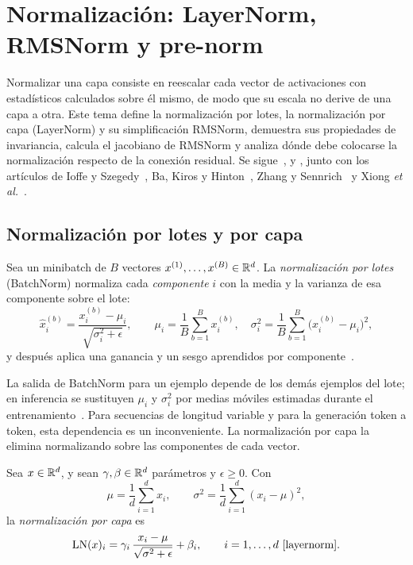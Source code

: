 \chapter{Normalización: LayerNorm, RMSNorm y pre-norm}
\label{tema:3}

Normalizar una capa consiste en reescalar cada vector de activaciones con estadísticos calculados sobre él mismo, de modo que su escala no derive de una capa a otra. Este tema define la normalización por lotes, la normalización por capa (LayerNorm) y su simplificación RMSNorm, demuestra sus propiedades de invariancia, calcula el jacobiano de RMSNorm y analiza dónde debe colocarse la normalización respecto de la conexión residual. Se sigue~\cite[§7.4]{bishopdl}, \cite[§8.5]{d2l} y \cite[§8.7.1]{gbc}, junto con los artículos de Ioffe y Szegedy~\cite{ioffe}, Ba, Kiros y Hinton~\cite{layernorm}, Zhang y Sennrich~\cite{rmsnorm} y Xiong \emph{et al.}~\cite{xiong}.

\section{Normalización por lotes y por capa}

\begin{definicion}\label{def:batchnorm}
Sea un minibatch de $B$ vectores $x^{(1)},\dots,x^{(B)}\in\mathbb{R}^{d}$. La \emph{normalización por lotes} (BatchNorm) normaliza cada \emph{componente} $i$ con la media y la varianza de esa componente sobre el lote:
\[
\hat x^{(b)}_i=\frac{x^{(b)}_i-\mu_i}{\sqrt{\sigma_i^{2}+\epsilon}},\qquad
\mu_i=\frac1B\sum_{b=1}^{B}x^{(b)}_i,\quad \sigma_i^{2}=\frac1B\sum_{b=1}^{B}\bigl(x^{(b)}_i-\mu_i\bigr)^{2},
\]
y después aplica una ganancia y un sesgo aprendidos por componente~\cite{ioffe}.
\end{definicion}

La salida de BatchNorm para un ejemplo depende de los demás ejemplos del lote; en inferencia se sustituyen $\mu_i$ y $\sigma_i^{2}$ por medias móviles estimadas durante el entrenamiento~\cite[§8.5.2]{d2l}. Para secuencias de longitud variable y para la generación token a token, esta dependencia es un inconveniente. La normalización por capa la elimina normalizando sobre las componentes de cada vector.

\begin{definicion}[LayerNorm]\label{def:layernorm}
Sea $x\in\mathbb{R}^{d}$, y sean $\gamma,\beta\in\mathbb{R}^{d}$ parámetros y $\epsilon\ge 0$. Con
\[
\mu=\frac1d\sum_{i=1}^{d}x_i,\qquad \sigma^{2}=\frac1d\sum_{i=1}^{d}(x_i-\mu)^{2},
\]
la \emph{normalización por capa} es
\[
\operatorname{LN}(x)_i=\gamma_i\,\frac{x_i-\mu}{\sqrt{\sigma^{2}+\epsilon}}+\beta_i,\qquad i=1,\dots,d~\cite{layernorm}.
\]
\end{definicion}

